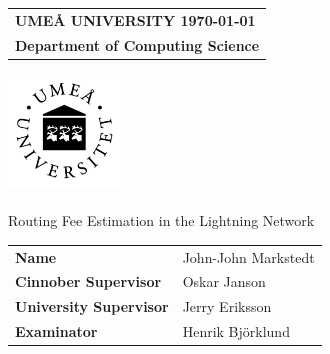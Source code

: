 \documentclass[a4paper, twocolumn, oneside]{article}
\title{\mytitle}
\author{John-John Markstedt}
\begin{document}
    \onecolumn
  
 	\setcounter{secnumdepth}{5}
	\begin{titlepage}
  	\thispagestyle{empty}
  	\begin{large}
  		\begin{tabular}{@{}p{\textwidth}@{}}
  			\textbf{UMEÅ UNIVERSITY \hfill \today} \\
  			\textbf{Department of Computing Science} \\
  			
  		\end{tabular}
  	\end{large}
  	\vspace{25mm}
  	\begin{center}
  		
  		\includegraphics[width=3.0cm]{umu-logo} \\

  		\huge{\textbf{\course}}\\
  		\vspace{10mm}
  		\LARGE{ Routing Fee Estimation in the Lightning Network } \\
  		\vspace{2mm}

		

  		\vspace{10mm}
  		\begin{large}
  			\begin{tabular}{ll}
  				\textbf{Name} & John-John Markstedt \\
  				\textbf{Cinnober Supervisor} & Oskar Janson\\
  				\textbf{University Supervisor} & Jerry Eriksson\\
  				\textbf{Examinator} & Henrik Björklund\\
  			\end{tabular}
  			\vfill
  			\vfill			
  		\end{large}
  		
  	\end{center}
  \end{titlepage}
  
%    
\end{document}
